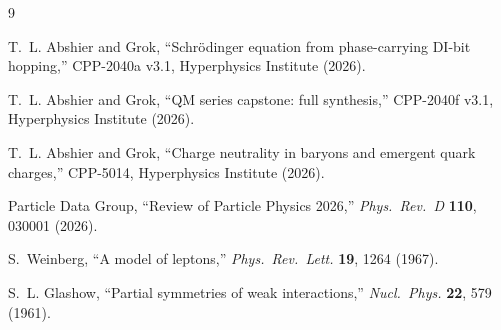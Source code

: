 \documentclass[11pt,a4paper]{article}
\begin{document}

\begin{thebibliography}{9}

T.~L. Abshier and Grok,
``Schr\"{o}dinger equation from phase-carrying DI-bit hopping,''
CPP-2040a v3.1, Hyperphysics Institute (2026).

T.~L. Abshier and Grok,
``QM series capstone: full synthesis,''
CPP-2040f v3.1, Hyperphysics Institute (2026).

T.~L. Abshier and Grok,
``Charge neutrality in baryons and emergent quark charges,''
CPP-5014, Hyperphysics Institute (2026).

Particle Data Group,
``Review of Particle Physics 2026,''
\textit{Phys.\ Rev.\ D} \textbf{110}, 030001 (2026).

S.~Weinberg,
``A model of leptons,''
\textit{Phys.\ Rev.\ Lett.} \textbf{19}, 1264 (1967).

S.~L. Glashow,
``Partial symmetries of weak interactions,''
\textit{Nucl.\ Phys.} \textbf{22}, 579 (1961).

\end{thebibliography}
\end{document}

